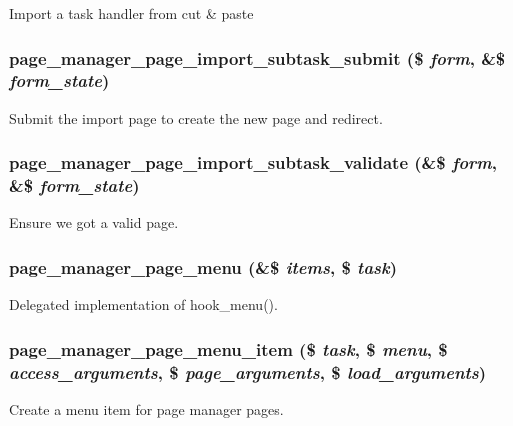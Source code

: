 \label{page_8admin_8inc_a506bcc1dfa1fd86e2cfe581842e54e30}
Import a task handler from cut \& paste \hypertarget{page_8admin_8inc_ab8bec4270961943c7ed320ee9d6fb45e}{
\subsubsection[{page\_\-manager\_\-page\_\-import\_\-subtask\_\-submit}]{\setlength{\rightskip}{0pt plus 5cm}page\_\-manager\_\-page\_\-import\_\-subtask\_\-submit (\$ {\em form}, \/  \&\$ {\em form\_\-state})}}
\label{page_8admin_8inc_ab8bec4270961943c7ed320ee9d6fb45e}
Submit the import page to create the new page and redirect. \hypertarget{page_8admin_8inc_ae5d65999777c0cd66feb5baa3ef6d16d}{
\subsubsection[{page\_\-manager\_\-page\_\-import\_\-subtask\_\-validate}]{\setlength{\rightskip}{0pt plus 5cm}page\_\-manager\_\-page\_\-import\_\-subtask\_\-validate (\&\$ {\em form}, \/  \&\$ {\em form\_\-state})}}
\label{page_8admin_8inc_ae5d65999777c0cd66feb5baa3ef6d16d}
Ensure we got a valid page. \hypertarget{page_8admin_8inc_a8be2096539f5a1536297131eda4ca631}{
\subsubsection[{page\_\-manager\_\-page\_\-menu}]{\setlength{\rightskip}{0pt plus 5cm}page\_\-manager\_\-page\_\-menu (\&\$ {\em items}, \/  \$ {\em task})}}
\label{page_8admin_8inc_a8be2096539f5a1536297131eda4ca631}
Delegated implementation of hook\_\-menu(). \hypertarget{page_8admin_8inc_a649d45ee42b5d2c2541a994585495c38}{
\subsubsection[{page\_\-manager\_\-page\_\-menu\_\-item}]{\setlength{\rightskip}{0pt plus 5cm}page\_\-manager\_\-page\_\-menu\_\-item (\$ {\em task}, \/  \$ {\em menu}, \/  \$ {\em access\_\-arguments}, \/  \$ {\em page\_\-arguments}, \/  \$ {\em load\_\-arguments})}}
\label{page_8admin_8inc_a649d45ee42b5d2c2541a994585495c38}
Create a menu item for page manager pages.


